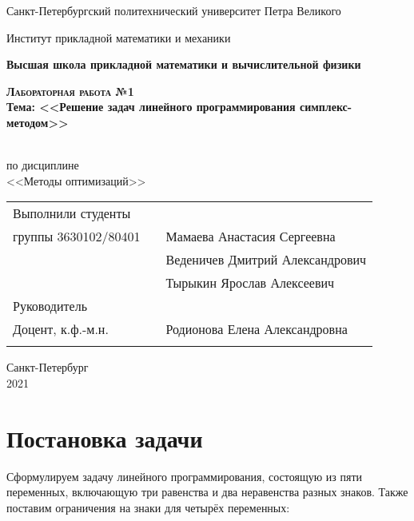 \documentclass{article}
\begin{document}
\begin{titlepage}
  \begin{center}
  
     
    \large
    
    Санкт-Петербургский политехнический университет Петра Великого
    
    Институт прикладной математики и механики
    
    \textbf{Высшая школа прикладной математики и вычислительной физики}
    
    \vfill
     
     
    \textsc{\textbf{\Large{Лабораторная работа №1}}}\\[5mm]
     
    {\large \textbf{Тема: <<Решение задач линейного программирования симплекс-методом>>}}
    
    \\ по дисциплине\\ <<Методы оптимизаций>>\\

\end{center}

\vfill


\begin{tabular}{l p{} l}
Выполнили студенты \\группы 3630102/80401   

&  &Мамаева Анастасия Сергеевна\\
&  &Веденичев Дмитрий Александрович\\
&  &Тырыкин Ярослав Алексеевич\\

Руководитель\\Доцент, к.ф.-м.н.& \hspace{0pt} &   Родионова Елена Александровна \\\\
\end{tabular}

\hfill \break
\hfill \break
\begin{center} Санкт-Петербург \\2021 \end{center}
\thispagestyle{empty}
 
\end{titlepage}
\newpage
\begin{center}
    \setcounter{page}{2}
    \tableofcontents  
\end{center}

\newpage
\section{Постановка задачи}
\noindent Сформулируем задачу линейного программирования, состоящую из пяти переменных, включающую три равенства и два неравенства разных знаков. Также поставим ограничения на знаки для четырёх переменных:
\end{document}
